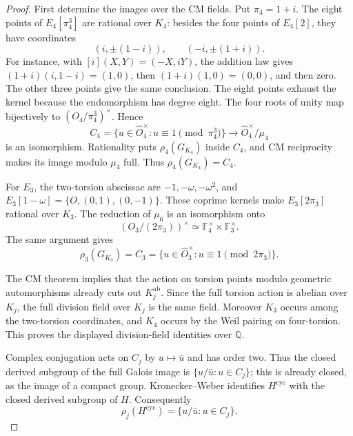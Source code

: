 \begin{proof}
First determine the images over the CM fields.  Put $\pi_4=1+i$.
The eight points of $E_4[\pi_4^3]$ are rational over $K_4$:
besides the four points of $E_4[2]$, they have coordinates
\[
 (i,\pm(1-i)),\qquad(-i,\pm(1+i)).
\]
For instance, with $[i](X,Y)=(-X,iY)$, the addition law gives
$(1+i)(i,1-i)=(1,0)$, then $(1+i)(1,0)=(0,0)$, and then zero.
The other three points give the same conclusion.  The eight points
exhaust the kernel because the endomorphism has degree eight.
The four roots of unity map bijectively to
$(O_4/\pi_4^3)^{\times}$.  Hence
\[
 C_4=\{u\in\widehat O_4^{\times}:u\equiv1\pmod{\pi_4^3}\}
       \longrightarrow\widehat O_4^{\times}/\mu_4
\]
is an isomorphism.  Rationality puts $\rho_4(G_{K_4})$ inside
$C_4$, and CM reciprocity makes its image modulo $\mu_4$ full.
Thus $\rho_4(G_{K_4})=C_4$.

For $E_3$, the two-torsion abscissae are
$-1,-\omega,-\omega^2$, and
$E_3[1-\omega]=\{O,(0,1),(0,-1)\}$.  These coprime kernels
make $E_3[2\pi_3]$ rational over $K_3$.
The reduction of $\mu_6$ is an isomorphism onto
\[
 (O_3/(2\pi_3))^{\times}
              \simeq\mathbb F_4^{\times}\times\mathbb F_3^{\times}.
\]
The same argument gives
\[
 \rho_3(G_{K_3})=C_3
       =\{u\in\widehat O_3^{\times}:u\equiv1\pmod{2\pi_3}\}.
\]

The CM theorem implies that the action on torsion points modulo
geometric automorphisms already cuts out $K_j^{\mathrm{ab}}$.
Since the full torsion action is
abelian over $K_j$, the full division field over $K_j$ is the same
field.  Moreover $K_3$ occurs among the two-torsion coordinates,
and $K_4$ occurs by the Weil pairing on four-torsion.  This proves
the displayed division-field identities over $\mathbb Q$.

Complex conjugation acts on $C_j$ by $u\mapsto\bar u$ and has
order two.  Thus the closed derived subgroup of the full Galois
image is $\{u/\bar u:u\in C_j\}$; this is already closed, as
the image of a compact group.  Kronecker--Weber identifies
$H^{\mathrm{cyc}}$ with the closed derived subgroup of $H$.
Consequently
\begin{equation}
 \rho_j(H^{\mathrm{cyc}})=\{u/\bar u:u\in C_j\}.
 \label{eq:adelic-ratio-image}
\end{equation}


\end{proof}
